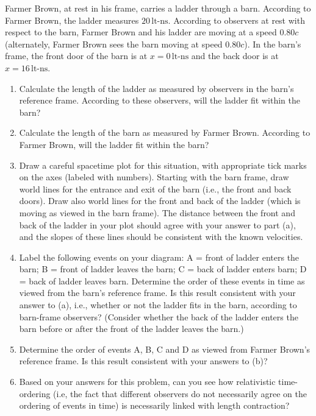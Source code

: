 \begin{exercise}
Farmer Brown, at rest in his frame, carries a ladder through
a barn.  According to Farmer Brown, the ladder measures
$20\,\text{lt-ns}$.  According to observers at rest with respect
to the barn, Farmer Brown and his ladder are moving at a
speed $0.80c$ (alternately, Farmer Brown sees the barn 
moving at speed $0.80c$).  In the barn's frame, the
front door of the barn is at $x = 0 \,\text{lt-ns}$ and the back 
door is at $x = 16\,\text{lt-ns}$.
\begin{enumerate}
\item Calculate the length of the ladder as measured by
observers in the barn's reference frame.  According to
these observers, will the ladder fit within the barn?
\item Calculate the length of the barn as measured by
Farmer Brown.  According to Farmer Brown, will the ladder
fit within the barn?
\item Draw a careful spacetime plot for this situation,
with appropriate tick marks on the axes (labeled with
numbers).  Starting with the barn frame, draw world
lines for the entrance and exit of the barn (i.e., the
front and back doors).  Draw also world lines for the front and
back of the ladder (which is moving as viewed in the
barn frame).  The distance between the front and back of
the ladder in your plot should agree with your answer
to part (a), and the slopes of these lines should be
consistent with the known velocities.
\item Label the following events on your diagram:
A = front of ladder enters the barn; B = front of ladder
leaves the barn; C = back of ladder enters barn;
D = back of ladder leaves barn.  Determine the order
of these events in time as viewed from the barn's
reference frame.  Is this result consistent with your
answer to (a), i.e., whether or not the ladder fits in the
barn, according to barn-frame observers?  (Consider
whether the back of the ladder enters the barn before
or after the front of the ladder leaves the barn.)
\item Determine the order of events A, B, C and D as
viewed from Farmer Brown's reference frame.  Is this
result consistent with your answers to (b)?
\item Based on your answers for this problem, can you
see how relativistic time-ordering (i.e, the fact that
different observers do not necessarily agree on the
ordering of events in time) is necessarily linked with
length contraction?
\end{enumerate}
\label{prob:farmer}
\end{exercise}


